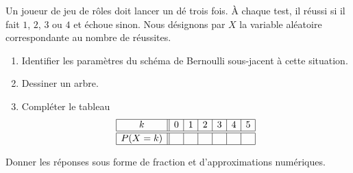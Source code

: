 
\begin{exercice}\label{exoPremiere-0086}

    Un joueur de jeu de rôles doit lancer un dé trois fois. À chaque test, il réussi si il fait \( 1\), \( 2\), \( 3\) ou \( 4\) et échoue sinon. Nous désignons par \( X\) la variable aléatoire correspondante au nombre de réussites.
    \begin{enumerate}
        \item
            Identifier les paramètres du schéma de Bernoulli sous-jacent à cette situation.
        \item
            Dessiner un arbre.
        \item
            Compléter le tableau
            \begin{equation*}
                \begin{array}[]{|c||c|c|c|c|c|c|}
                    \hline
                    k&0&1&2&3&4&5\\
                    \hline\hline
                    P(X=k)&&&&&&\\
                    \hline
                \end{array}
            \end{equation*}
    \end{enumerate}
    Donner les réponses sous forme de fraction et d'approximations numériques.

\end{exercice}
